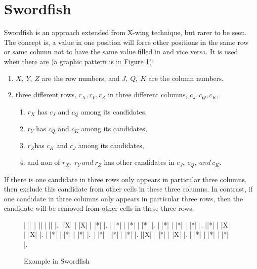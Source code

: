 \documentclass[11pt]{report}
\begin{document}
\section{Swordfish}
\label{sec:Swordfish}
Swordfish is an approach extended from X-wing technique, but rarer to be seen. The concept is, a value in one position will force other positions in the same row or same column not to have the same value filled in and vice versa. It is used when there are (a graphic pattern is in Figure \ref{fig:swordfish}):
\begin{enumerate}
\item $X,\ Y,\ Z$ are the row numbers, and $J,\ Q,\ K$ are the column numbers.
\item three different rows, $r_{X}, r_{Y}, r_{Z}$ in three different columns, $c_{J}, c_{Q}, c_{K}$,
\begin{enumerate}
\item $r_{X}$ has $c_{J}$ and $c_{Q}$ among its candidates,
\item $r_{Y}$ has $c_{Q}$ and $c_{K}$ among its candidates,
\item $r_{Z}$has $c_{K}$ and $c_{J}$ among its candidates,
\item and non of $r_{X},\ r_{Y}\, and\ r_{Z}$ has other candidates in $c_{J},\ c_{Q},\ and\ c_{K}.$
\end{enumerate}
\end{enumerate}
If there is one candidate in three rows only appears in particular three columns, then exclude this candidate from other cells in these three columns. In contrast, if one candidate in three columns only appears in particular three rows, then the candidate will be removed from other cells in these three rows.

\begin{figure}
\begin{sudoku}
| |{}| | |{}| | |{}| |.
 |{}|X| | |X| | |*| |.
| |*| | |*| | |*| |.
| |*| | |*| | |*| |.
|{}|*| | |X| | |X| |.
| |*| | |*| | |*| |.
| |*| | |*| | |*| |.
|{}|X| | |*| | |X| |.
| |*| | |*| | |*| |.
\end{sudoku}
\caption{Example in Swordfish}
\label{fig:swordfish}
\end{figure}
\end{document}
